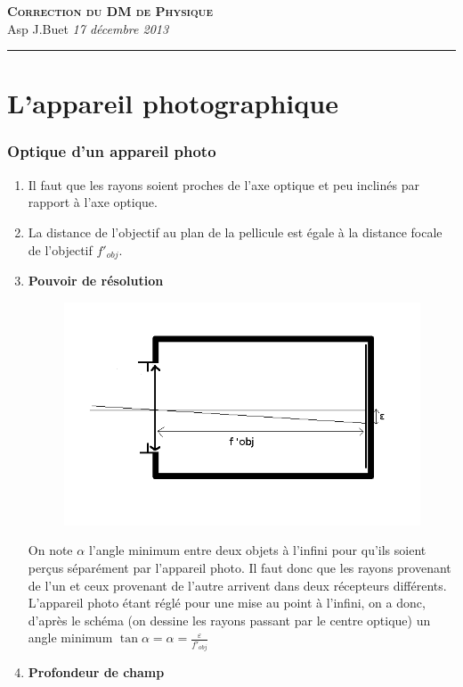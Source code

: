 \documentclass[10pt,a4paper]{article}
\newcommand{\Titre}[3]{\begin{center} {\LARGE\textbf{\textsc{#1}}}\\ #2 \hfill \emph{#3} \\  \hrule\vspace{\baselineskip}\end{center}}
\begin{document}
\Titre{Correction du DM de Physique}{Asp J.Buet}{17 décembre 2013}
\thispagestyle{plain}
\pagestyle{plain}


\part*{L'appareil photographique}

\bigskip
\section{Optique d'un appareil photo}

\begin{enumerate}
\item Il faut que les rayons soient proches de l'axe optique et peu inclinés par rapport à l'axe optique.
\item La distance de l'objectif au plan de la pellicule est égale à la distance focale de l'objectif $f'_{obj}$.
\smallskip
\item \textbf{Pouvoir de résolution}

\begin{figure}[h!]
\center
\includegraphics[scale=0.45]{pouvoir_resolution.png}
\end{figure}

On note $\alpha$ l'angle minimum entre deux objets à l'infini pour qu'ils soient perçus séparément par l'appareil photo. Il faut donc que les rayons provenant
de l'un et ceux provenant de l'autre arrivent dans deux récepteurs différents. L'appareil photo étant réglé pour une mise au point à l'infini, on a donc, 
d'après le schéma (on dessine les rayons passant par le centre optique) un angle minimum $\boxed{\tan\alpha=\alpha=\frac{\varepsilon}{f'_{obj}}}$
\smallskip
\item \textbf{Profondeur de champ}


\end{enumerate}
\end{document}
